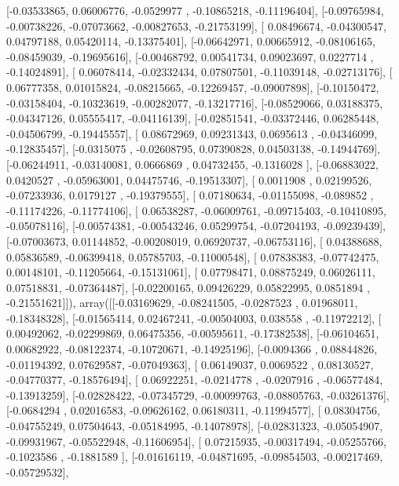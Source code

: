 \documentclass{article}
\begin{document}
       [-0.03533865,  0.06006776, -0.0529977 , -0.10865218, -0.11196404],
       [-0.09765984, -0.00738226, -0.07073662, -0.00827653, -0.21753199],
       [ 0.08496674, -0.04300547,  0.04797188,  0.05420114, -0.13375401],
       [-0.06642971,  0.00665912, -0.08106165, -0.08459039, -0.19695616],
       [-0.00468792,  0.00541734,  0.09023697,  0.0227714 , -0.14024891],
       [ 0.06078414, -0.02332434,  0.07807501, -0.11039148, -0.02713176],
       [ 0.06777358,  0.01015824, -0.08215665, -0.12269457, -0.09007898],
       [-0.10150472, -0.03158404, -0.10323619, -0.00282077, -0.13217716],
       [-0.08529066,  0.03188375, -0.04347126,  0.05555417, -0.04116139],
       [-0.02851541, -0.03372446,  0.06285448, -0.04506799, -0.19445557],
       [ 0.08672969,  0.09231343,  0.0695613 , -0.04346099, -0.12835457],
       [-0.0315075 , -0.02608795,  0.07390828,  0.04503138, -0.14944769],
       [-0.06244911, -0.03140081,  0.0666869 ,  0.04732455, -0.1316028 ],
       [-0.06883022,  0.0420527 , -0.05963001,  0.04475746, -0.19513307],
       [ 0.0011908 ,  0.02199526, -0.07233936,  0.0179127 , -0.19379555],
       [ 0.07180634, -0.01155098, -0.089852  , -0.11174226, -0.11774106],
       [ 0.06538287, -0.06009761, -0.09715403, -0.10410895, -0.05078116],
       [-0.00574381, -0.00543246,  0.05299754, -0.07204193, -0.09239439],
       [-0.07003673,  0.01144852, -0.00208019,  0.06920737, -0.06753116],
       [ 0.04388688,  0.05836589, -0.06399418,  0.05785703, -0.11000548],
       [ 0.07838383, -0.07742475,  0.00148101, -0.11205664, -0.15131061],
       [ 0.07798471,  0.08875249,  0.06026111,  0.07518831, -0.07364487],
       [-0.02200165,  0.09426229,  0.05822995,  0.0851894 , -0.21551621]]), array([[-0.03169629, -0.08241505, -0.0287523 ,  0.01968011, -0.18348328],
       [-0.01565414,  0.02467241, -0.00504003,  0.038558  , -0.11972212],
       [ 0.00492062, -0.02299869,  0.06475356, -0.00595611, -0.17382538],
       [-0.06104651,  0.00682922, -0.08122374, -0.10720671, -0.14925196],
       [-0.0094366 ,  0.08844826, -0.01194392,  0.07629587, -0.07049363],
       [ 0.06149037,  0.0069522 ,  0.08130527, -0.04770377, -0.18576494],
       [ 0.06922251, -0.0214778 , -0.0207916 , -0.06577484, -0.13913259],
       [-0.02828422, -0.07345729, -0.00099763, -0.08805763, -0.03261376],
       [-0.0684294 ,  0.02016583, -0.09626162,  0.06180311, -0.11994577],
       [ 0.08304756, -0.04755249,  0.07504643, -0.05184995, -0.14078978],
       [-0.02831323, -0.05054907, -0.09931967, -0.05522948, -0.11606954],
       [ 0.07215935, -0.00317494, -0.05255766, -0.1023586 , -0.1881589 ],
       [-0.01616119, -0.04871695, -0.09854503, -0.00217469, -0.05729532],
\end{document}
